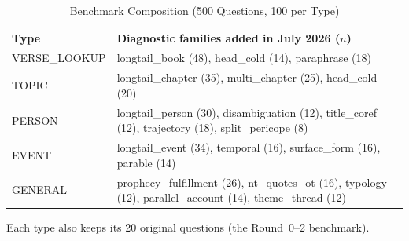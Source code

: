\begin{table}[!t]
\caption{Benchmark Composition (500 Questions, 100 per Type)}
\label{tab:benchmark}
\centering
\begin{threeparttable}
\footnotesize
\begin{tabular}{@{}l>{\raggedright\arraybackslash}p{6.0cm}@{}}
\toprule
Type & Diagnostic families added in July 2026 ($n$) \\
\midrule
VERSE\_LOOKUP & longtail\_book (48), head\_cold (14), paraphrase (18) \\
TOPIC & longtail\_chapter (35), multi\_chapter (25), head\_cold (20) \\
PERSON & longtail\_person (30), disambiguation (12), title\_coref
(12), trajectory (18), split\_pericope (8) \\
EVENT & longtail\_event (34), temporal (16), surface\_form (16),
parable (14) \\
GENERAL & prophecy\_fulfillment (26), nt\_quotes\_ot (16), typology
(12), parallel\_account (14), theme\_thread (12) \\
\bottomrule
\end{tabular}
\begin{tablenotes}\footnotesize
\item Each type also keeps its 20 original questions (the Round~0--2
benchmark).
\end{tablenotes}
\end{threeparttable}
\end{table}

